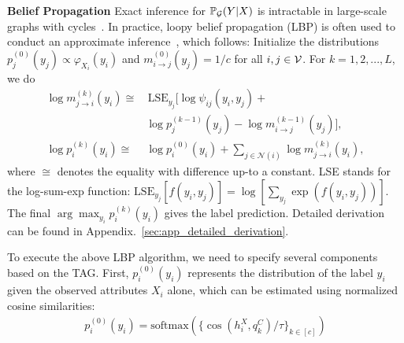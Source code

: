 \textbf{Belief Propagation} %
 Exact inference for $\mathbb{P}_{\mathcal{G}}(Y|X)$ is intractable in large-scale graphs with cycles~\cite{koller2009probabilistic}. In practice, loopy belief propagation (LBP) is often used to conduct an approximate inference~\cite{murphy2013loopy}, which follows: Initialize the distributions $p_j^{(0)}(y_j)\propto\varphi_{X_i}(y_i)$ and $m_{i \to j}^{(0)}(y_j) = 1/c$ for all $i,j\in\mathcal{V}$. For $k=1,2,...,L$, we do 
 \begin{align}
 \label{eq:message_passing}
 \log m_{j \to i}^{(k)}(y_i) \cong &\, \text{LSE}_{y_j}[\log \psi_{ij}(y_i,y_j) + \\ &
\log p_j^{(k-1)}(y_j) - \log m_{i \to j}^{(k-1)}(y_j)], \nonumber \\
 \log p_i^{(k)}(y_i) \cong &\log p_i^{(0)}(y_i) + \sum_{j \in \mathcal{N}(i)} \log m_{j \to i}^{(k)}(y_i),  \nonumber
\end{align} where $\cong$ denotes the equality with difference up-to a constant. LSE stands for the log-sum-exp function: 
$\text{LSE}_{y_j} [f(y_i, y_j)] = \log \left[ \sum_{y_j} \exp (f(y_i, y_j)) \right]$. The final $\arg\max_{y_i} p_i^{(k)}(y_i)$ gives the label prediction. 
Detailed derivation can be found in Appendix.~\ref{sec:app_detailed_derivation}. %

\textbf{\proj} To execute the above LBP algorithm, we need to specify several components based on the TAG. First, $p_i^{(0)}(y_i)$ represents the distribution of the label $y_i$ given the observed attributes $X_i$ alone, which can be estimated using normalized cosine similarities: %
\begin{align}
\label{eq:node_potential}
p_i^{(0)}(y_i) = \text{softmax}(\{\cos(h^{X}_i, q^{C}_k)/\tau\}_{k\in[c]})
\end{align}








